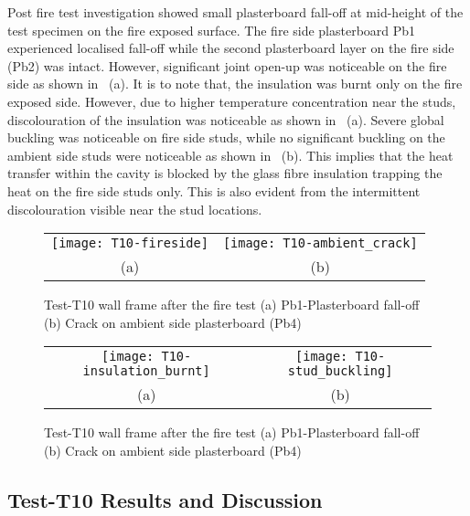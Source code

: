 Post fire test investigation showed small plasterboard fall-off at mid-height of the test specimen on the fire exposed surface. The fire side plasterboard Pb1 experienced localised fall-off while the second plasterboard layer on the fire side (Pb2) was intact. However, significant joint open-up was noticeable on the fire side as shown in ~(a). It is to note that, the insulation was burnt only on the fire exposed side. However, due to higher temperature concentration near the studs, discolouration of the insulation was noticeable as shown in ~(a). Severe global buckling was noticeable on fire side studs, while no significant buckling on the ambient side studs were noticeable as shown in ~(b). This implies that the heat transfer within the cavity is blocked by the glass fibre insulation trapping the heat on the fire side studs only. This is also evident from the intermittent discolouration visible near the stud locations. 
\begin{figure}[!htbp]
	\centering
		\begin{tabular}{cc}
			\texttt{[image: T10-fireside]} & \texttt{[image: T10-ambient\_crack]} \\ 
			(a) & (b) \\ 
		\end{tabular} 
		\caption{Test-T10 wall frame after the fire test (a) Pb1-Plasterboard fall-off (b) Crack on ambient side plasterboard (Pb4)}
		\label{fig:T10-fireside}
\end{figure}
\begin{figure}[!htbp]
	\centering
		\begin{tabular}{cc}
			\texttt{[image: T10-insulation\_burnt]} & \texttt{[image: T10-stud\_buckling]} \\ 
			(a) & (b) \\ 
		\end{tabular} 
		\caption{Test-T10 wall frame after the fire test (a) Pb1-Plasterboard fall-off (b) Crack on ambient side plasterboard (Pb4)}
		\label{fig:T10-buckling}
\end{figure}

\subsection{Test-T10 Results and Discussion}

